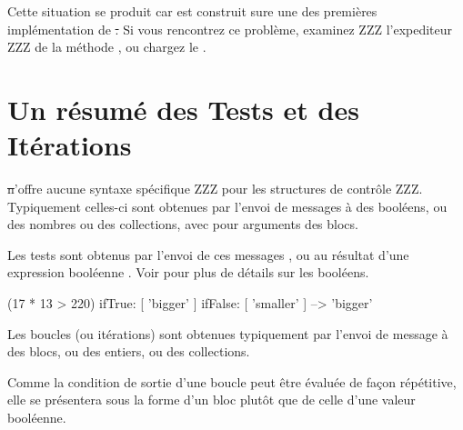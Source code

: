 \documentclass[a4paper,10pt,twoside]{book}
\begin{document}
Cette situation se produit car \sq est construit sure une des premi\`{e}res impl\'{e}mentation de \st.
Si vous rencontrez ce probl\`{e}me, examinez ZZZ l'expediteur ZZZ de la m\'{e}thode , ou chargez le .






\section{Un r\'{e}sumé des Tests et des It\'{e}rations}

\st n'offre aucune syntaxe sp\'{e}cifique ZZZ pour les structures de contr\^{o}le ZZZ.
Typiquement celles-ci sont obtenues par l'envoi de messages \`{a} des bool\'{e}ens, ou des nombres ou des collections, avec pour arguments des blocs.

Les tests sont obtenus par l'envoi de ces messages  ,  ou  au r\'{e}sultat d'une expression bool\'{e}enne . Voir  pour plus de d\'{e}tails sur les bool\'{e}ens.

\begin{code}{}
(17 * 13 > 220)
   ifTrue: [ 'bigger' ]
   ifFalse: [ 'smaller' ] --> 'bigger'
\end{code}

Les boucles (ou it\'{e}rations) sont obtenues typiquement par l'envoi de message \`{a} des blocs, ou des entiers, ou des collections.

Comme la condition de sortie d'une boucle peut \^{e}tre \'{e}valu\'{e}e de fa\c{c}on r\'{e}p\'{e}titive, elle se pr\'{e}sentera sous la forme d'un bloc plut\^{o}t que de celle d'une valeur bool\'{e}enne.
\end{document}
